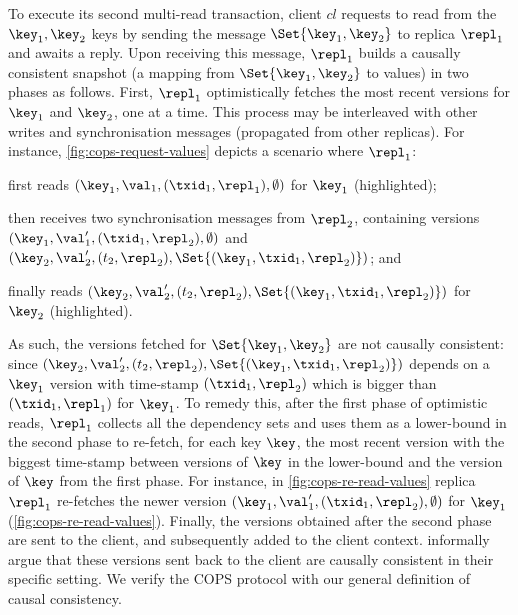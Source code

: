 To execute its second multi-read transaction,
client  \( cl \) requests to read from the $\key_1, \key_2$ keys by sending the message 
\( \Set{\key_1, \key_2} \) to replica $\repl_1$ and awaits a reply.
Upon receiving this message, $\repl_1$ builds a causally consistent snapshot (a mapping from $\Set{\key_1, \key_2}$ to values) in two phases as follows. 
First, $\repl_1$ optimistically fetches the most recent versions for $\key_1$ and $\key_2$,
one at a time. 
This process may be interleaved with other writes and synchronisation messages (propagated from other replicas). 
For instance, \cref{fig:cops-request-values} depicts a scenario where \( \repl_1 \):
\begin{enumerate*}
	\item first reads \( (\key_1,\val_1,(\txid_1,\repl_1), \emptyset) \) for $\key_1$ (highlighted); %
	\item then receives two synchronisation messages from \( \repl_2 \), 
containing versions \( ( \key_1, \val'_1, (\txid_1,\repl_2),\emptyset ) \) and \( ( \key_2, \val'_2, (t_2,\repl_2),\Set{(\key_1,\txid_1,\repl_2)} ) \); and
	\item finally reads \( ( \key_2, \val'_2, (t_2,\repl_2),\Set{(\key_1,\txid_1,\repl_2)} ) \) for $\key_2$ (highlighted).
\end{enumerate*}
As such, the versions fetched for \( \Set{\key_1,\key_2}\) are not causally consistent: 
since \( ( \key_2, \val'_2, (t_2,\repl_2),\Set{(\key_1,\txid_1,\repl_2)} ) \) depends on 
a $\key_1$ version with time-stamp $(\txid_1, \repl_2)$ which is bigger than $(\txid_1, \repl_1)$ for $\key_1$.
To remedy this, after the first phase of optimistic reads,
$\repl_1$ collects all the dependency sets and uses them as a lower-bound in the second phase
to re-fetch, for each key \( \key \), the most recent version with the biggest time-stamp between versions of \( \key \)
in the lower-bound and the version of \( \key \) from the first phase.
For instance, in \cref{fig:cops-re-read-values} replica $\repl_1$ re-fetches the newer version \( ( \key_1, \val'_1, (\txid_1,\repl_2),\emptyset ) \) for \( \key_1 \) (\cref{fig:cops-re-read-values}).
Finally, the versions obtained after the second phase 
are sent to the client, and subsequently added to the client context.
\citet{cops} informally argue that these versions sent back to the client are causally consistent in their specific setting.
We verify the COPS protocol with our general definition of causal consistency.

